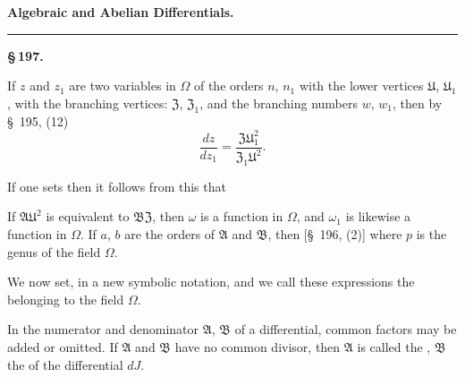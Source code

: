 \begin{center}

\textbf{Algebraic and Abelian Differentials.}

\rule{0.3\linewidth}{0.4pt}

\textbf{\S\,197. }
\end{center}

If $z$ and $z_1$ are two variables in $\Omega$ of the orders $n$, $n_1$ with the lower vertices $\mathfrak{U}$, $\mathfrak{U}_1$, with the branching vertices: $\mathfrak{Z}$, $\mathfrak{Z}_1$, and the branching numbers $w$, $w_1$, then by \S\ 195, (12)
\[
\dfrac{dz}{dz_1} = \dfrac{\mathfrak{Z}\mathfrak{U}_1^2}{\mathfrak{Z}_1\mathfrak{U}^2}.
\]

If one sets
then it follows from this that

If $\mathfrak{A}\mathfrak{U}^2$ is equivalent to $\mathfrak{B}\mathfrak{Z}$, then $\omega$ is a function in $\Omega$, and $\omega_1$ is likewise a function in $\Omega$. If $a$, $b$ are the orders of $\mathfrak{A}$ and $\mathfrak{B}$, then [\S\ 196, (2)]
where $p$ is the genus of the field $\Omega$.

We now set, in a new symbolic notation,
and we call these expressions the  belonging to the field $\Omega$.

In the numerator and denominator $\mathfrak{A}$, $\mathfrak{B}$ of a differential, common factors may be added or omitted. If $\mathfrak{A}$ and $\mathfrak{B}$ have no common divisor, then $\mathfrak{A}$ is called the , $\mathfrak{B}$ the  of the differential $dJ$.
